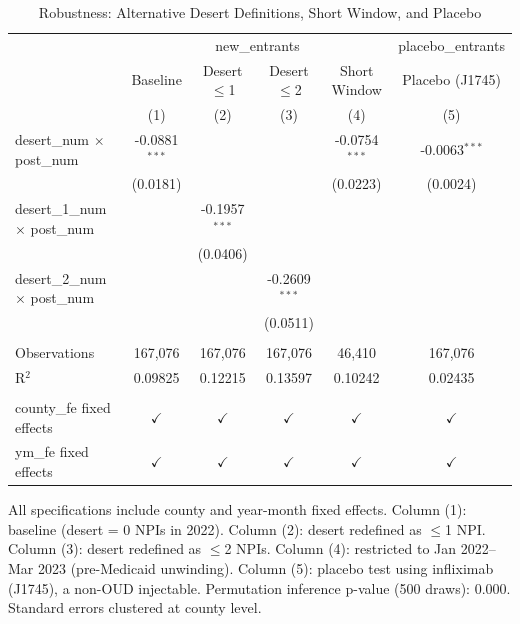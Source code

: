 
\begin{table}[htbp]
   \caption{\label{tab:robustness} Robustness: Alternative Desert Definitions, Short Window, and Placebo}
   \bigskip
   \centering
   \begin{tabular}{lccccc}
      \toprule
       & \multicolumn{4}{c}{new\_entrants} & placebo\_entrants\\
                                            & Baseline        & Desert $\leq$1  & Desert $\leq$2  & Short Window    & Placebo (J1745) \\   
                                            & (1)             & (2)             & (3)             & (4)             & (5)\\  
      \midrule 
      desert\_num $\times$ post\_num        & -0.0881$^{***}$ &                 &                 & -0.0754$^{***}$ & -0.0063$^{***}$\\   
                                            & (0.0181)        &                 &                 & (0.0223)        & (0.0024)\\   
      desert\_1\_num $\times$ post\_num     &                 & -0.1957$^{***}$ &                 &                 &   \\   
                                            &                 & (0.0406)        &                 &                 &   \\   
      desert\_2\_num $\times$ post\_num     &                 &                 & -0.2609$^{***}$ &                 &   \\   
                                            &                 &                 & (0.0511)        &                 &   \\   
       \\
      Observations                          & 167,076         & 167,076         & 167,076         & 46,410          & 167,076\\  
      R$^2$                                 & 0.09825         & 0.12215         & 0.13597         & 0.10242         & 0.02435\\  
       \\
      county\_fe fixed effects              & $\checkmark$    & $\checkmark$    & $\checkmark$    & $\checkmark$    & $\checkmark$\\   
      ym\_fe fixed effects                  & $\checkmark$    & $\checkmark$    & $\checkmark$    & $\checkmark$    & $\checkmark$\\   
      \bottomrule
   \end{tabular}
   
   \par \raggedright 
   All specifications include county and year-month fixed effects. Column (1): baseline (desert = 0 NPIs in 2022). Column (2): desert redefined as $\leq$1 NPI. Column (3): desert redefined as $\leq$2 NPIs. Column (4): restricted to Jan 2022--Mar 2023 (pre-Medicaid unwinding). Column (5): placebo test using infliximab (J1745), a non-OUD injectable. Permutation inference p-value (500 draws): 0.000. Standard errors clustered at county level.
\end{table}



